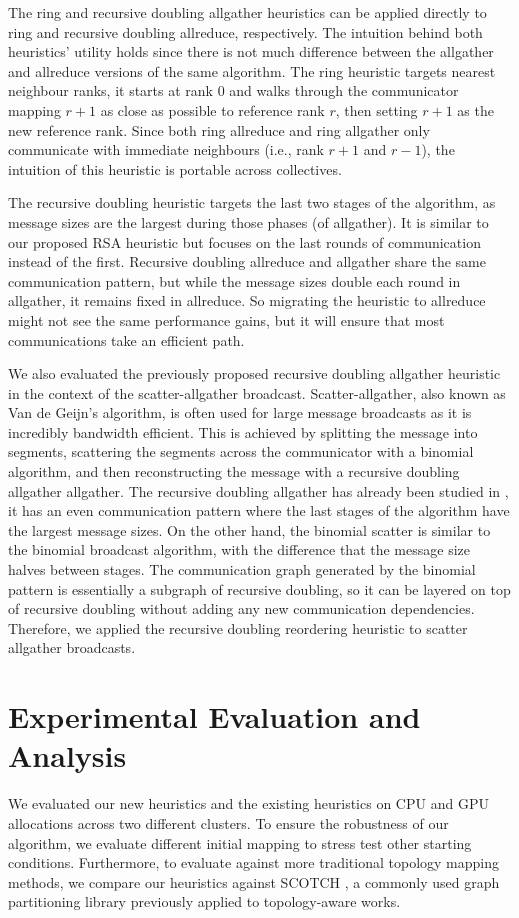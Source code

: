 The ring and recursive doubling allgather heuristics can be applied directly to ring and recursive doubling allreduce, respectively. 
The intuition behind both heuristics' utility holds since there is not much difference between the allgather and allreduce versions of the same algorithm.
The ring heuristic targets nearest neighbour ranks, it starts at rank 0 and walks through the communicator mapping $r+1$ as close as possible to reference rank $r$, then setting $r+1$ as the new reference rank.
Since both ring allreduce and ring allgather only communicate with immediate neighbours (i.e., rank $r+1$ and $r-1$), the intuition of this heuristic is portable across collectives.

The recursive doubling heuristic targets the last two stages of the algorithm, as message sizes are the largest during those phases (of allgather). 
It is similar to our proposed \gls{RSA} heuristic but focuses on the last rounds of communication instead of the first. 
Recursive doubling allreduce and allgather share the same communication pattern, but while the message sizes double each round in allgather, it remains fixed in allreduce.
So migrating the heuristic to allreduce might not see the same performance gains, but it will ensure that most communications take an efficient path.

We also evaluated the previously proposed recursive doubling allgather heuristic in the context of the scatter-allgather broadcast.
Scatter-allgather, also known as Van de Geijn's algorithm, is often used for large message broadcasts as it is incredibly bandwidth efficient. 
This is achieved by splitting the message into segments, scattering the segments across the communicator with a binomial algorithm, and then reconstructing the message with a recursive doubling allgather allgather.
The recursive doubling allgather has already been studied in \cite{Mirsadeghi2016TopoAwareCollRR}, it has an even communication pattern where the last stages of the algorithm have the largest message sizes.
On the other hand, the binomial scatter is similar to the binomial broadcast algorithm, with the difference that the message size halves between stages. 
The communication graph generated by the binomial pattern is essentially a subgraph of recursive doubling, so it can be layered on top of recursive doubling without adding any new communication dependencies. 
Therefore, we applied the recursive doubling reordering heuristic to scatter allgather broadcasts.

\section{Experimental Evaluation and Analysis}
We evaluated our new heuristics and the existing heuristics on \gls{CPU} and \gls{GPU} allocations across two different clusters.
To ensure the robustness of our algorithm, we evaluate different initial mapping to stress test other starting conditions.
Furthermore, to evaluate against more traditional topology mapping methods, we compare our heuristics against SCOTCH \cite{Pellegrini2012SCOTCH}, a commonly used graph partitioning library previously applied to topology-aware works.

